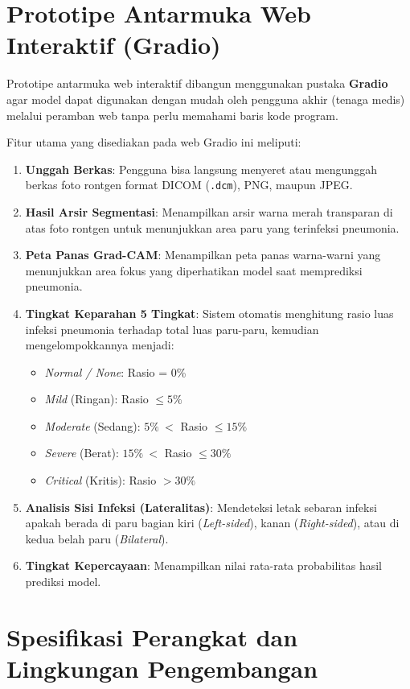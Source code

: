 \documentclass[12pt,a4paper,oneside]{book}
\begin{document}
\section{Prototipe Antarmuka Web Interaktif (Gradio)}

Prototipe antarmuka web interaktif dibangun menggunakan pustaka \textbf{Gradio} agar model dapat digunakan dengan mudah oleh pengguna akhir (tenaga medis) melalui peramban web tanpa perlu memahami baris kode program.

Fitur utama yang disediakan pada web Gradio ini meliputi:
\begin{enumerate}
  \item \textbf{Unggah Berkas}: Pengguna bisa langsung menyeret atau mengunggah berkas foto rontgen format DICOM (\texttt{.dcm}), PNG, maupun JPEG.
  \item \textbf{Hasil Arsir Segmentasi}: Menampilkan arsir warna merah transparan di atas foto rontgen untuk menunjukkan area paru yang terinfeksi pneumonia.
  \item \textbf{Peta Panas Grad-CAM}: Menampilkan peta panas warna-warni yang menunjukkan area fokus yang diperhatikan model saat memprediksi pneumonia.
  \item \textbf{Tingkat Keparahan 5 Tingkat}: Sistem otomatis menghitung rasio luas infeksi pneumonia terhadap total luas paru-paru, kemudian mengelompokkannya menjadi:
  \begin{itemize}
    \item \textit{Normal / None}: Rasio = 0\%
    \item \textit{Mild} (Ringan): Rasio $\le 5\%$
    \item \textit{Moderate} (Sedang): $5\%\ <$ Rasio $\le 15\%$
    \item \textit{Severe} (Berat): $15\%\ <$ Rasio $\le 30\%$
    \item \textit{Critical} (Kritis): Rasio $> 30\%$
  \end{itemize}
  \item \textbf{Analisis Sisi Infeksi (Lateralitas)}: Mendeteksi letak sebaran infeksi apakah berada di paru bagian kiri (\textit{Left-sided}), kanan (\textit{Right-sided}), atau di kedua belah paru (\textit{Bilateral}).
  \item \textbf{Tingkat Kepercayaan}: Menampilkan nilai rata-rata probabilitas hasil prediksi model.
\end{enumerate}

\section{Spesifikasi Perangkat dan Lingkungan Pengembangan}
\end{document}
